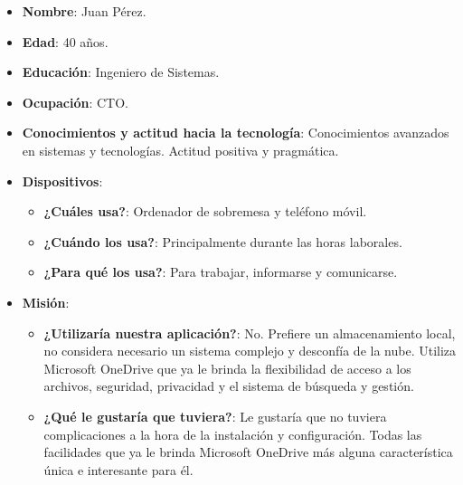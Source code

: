     \begin{itemize}
        \item \textbf{Nombre}: Juan Pérez.
        \item \textbf{Edad}: 40 años.
        \item \textbf{Educación}: Ingeniero de Sistemas.
        \item \textbf{Ocupación}: CTO.
        \item \textbf{Conocimientos y actitud hacia la tecnología}: Conocimientos avanzados en sistemas y tecnologías. Actitud positiva y pragmática.
        \item \textbf{Dispositivos}:
            \begin{itemize}
            \item \textbf{¿Cuáles usa?}: Ordenador de sobremesa y teléfono móvil. 
            \item \textbf{¿Cuándo los usa?}: Principalmente durante las horas laborales.
            \item \textbf{¿Para qué los usa?}: Para trabajar, informarse y comunicarse.
            \end{itemize}
        \item \textbf{Misión}:
            \begin{itemize}

                \item \textbf{¿Utilizaría nuestra aplicación?}: No. Prefiere un almacenamiento local, no considera necesario un sistema complejo y desconfía de la nube. Utiliza Microsoft OneDrive que ya le brinda la flexibilidad de acceso a los archivos, seguridad, privacidad y el sistema de búsqueda y gestión.

                \item \textbf{¿Qué le gustaría que tuviera?}: Le gustaría que no tuviera complicaciones a la hora de la instalación y configuración. Todas las facilidades que ya le brinda Microsoft OneDrive más alguna característica única e interesante para él.

            \end{itemize}
        
    \end{itemize}

